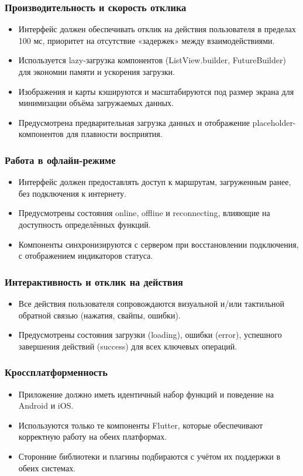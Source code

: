 \subsubsection*{Производительность и скорость отклика}
\begin{itemize}
    \item Интерфейс должен обеспечивать отклик на действия пользователя в пределах 100 мс, приоритет на отсутствие «задержек» между взаимодействиями.
    \item Используется lazy-загрузка компонентов (ListView.builder, FutureBuilder) для экономии памяти и ускорения загрузки.
    \item Изображения и карты кэшируются и масштабируются под размер экрана для минимизации объёма загружаемых данных.
    \item Предусмотрена предварительная загрузка данных и отображение placeholder-компонентов для плавности восприятия.
\end{itemize}

\subsubsection*{Работа в офлайн-режиме}
\begin{itemize}
    \item Интерфейс должен предоставлять доступ к маршрутам, загруженным ранее, без подключения к интернету.
    \item Предусмотрены состояния online, offline и reconnecting, влияющие на доступность определённых функций.
    \item Компоненты синхронизируются с сервером при восстановлении подключения, с отображением индикаторов статуса.
\end{itemize}

\subsubsection*{Интерактивность и отклик на действия}
\begin{itemize}
    \item Все действия пользователя сопровождаются визуальной и/или тактильной обратной связью (нажатия, свайпы, ошибки).
    \item Предусмотрены состояния загрузки (loading), ошибки (error), успешного завершения действий (success) для всех ключевых операций.
\end{itemize}

\subsubsection*{Кроссплатформенность}
\begin{itemize}
    \item Приложение должно иметь идентичный набор функций и поведение на Android и iOS.
    \item Используются только те компоненты Flutter, которые обеспечивают корректную работу на обеих платформах.
    \item Сторонние библиотеки и плагины подбираются с учётом их поддержки в обеих системах.
\end{itemize}

